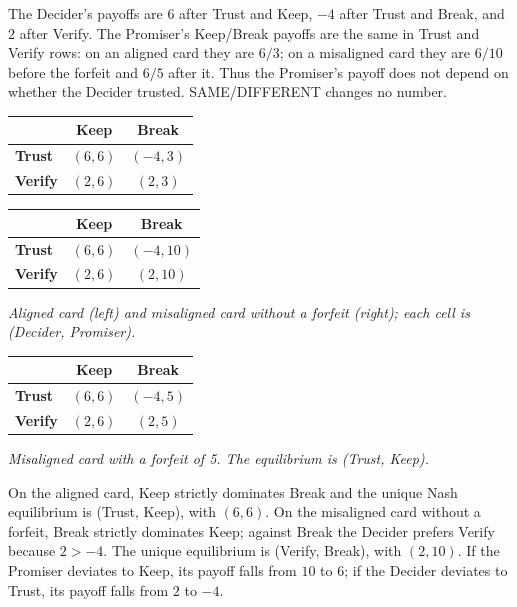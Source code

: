The Decider's payoffs are $6$ after Trust and Keep, $-4$ after Trust and Break, and $2$ after Verify. The Promiser's Keep/Break payoffs are the same in Trust and Verify rows: on an aligned card they are $6/3$; on a misaligned card they are $6/10$ before the forfeit and $6/5$ after it. Thus the Promiser's payoff does not depend on whether the Decider trusted. SAME/DIFFERENT changes no number.

\begin{center}\small
\begin{tabular}{@{}lcc@{}}\toprule
& \textbf{Keep} & \textbf{Break}\\\midrule
\textbf{Trust} & $(6,6)$ & $(-4,3)$\\
\textbf{Verify} & $(2,6)$ & $(2,3)$\\\bottomrule
\end{tabular}\quad
\begin{tabular}{@{}lcc@{}}\toprule
& \textbf{Keep} & \textbf{Break}\\\midrule
\textbf{Trust} & $(6,6)$ & $(-4,10)$\\
\textbf{Verify} & $(2,6)$ & $(2,10)$\\\bottomrule
\end{tabular}\end{center}
\noindent\textit{Aligned card (left) and misaligned card without a forfeit (right); each cell is (Decider, Promiser).}

\begin{center}\small
\begin{tabular}{@{}lcc@{}}\toprule
& \textbf{Keep} & \textbf{Break}\\\midrule
\textbf{Trust} & $(6,6)$ & $(-4,5)$\\
\textbf{Verify} & $(2,6)$ & $(2,5)$\\\bottomrule
\end{tabular}\end{center}
\noindent\textit{Misaligned card with a forfeit of 5. The equilibrium is (Trust, Keep).}

On the aligned card, Keep strictly dominates Break and the unique Nash equilibrium is (Trust, Keep), with $(6,6)$. On the misaligned card without a forfeit, Break strictly dominates Keep; against Break the Decider prefers Verify because $2>-4$. The unique equilibrium is (Verify, Break), with $(2,10)$. If the Promiser deviates to Keep, its payoff falls from $10$ to $6$; if the Decider deviates to Trust, its payoff falls from $2$ to $-4$.

